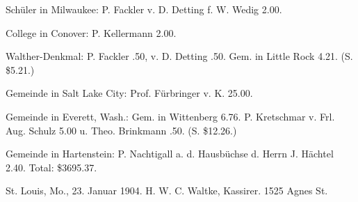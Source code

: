Schüler in Milwaukee: P. Fackler v. D. Detting f. W. Wedig 2.00.

College in Conover: P. Kellermann 2.00.

Walther-Denkmal: P. Fackler .50, v. D. Detting .50. Gem. in Little Rock 4.21. (S. \$5.21.)

Gemeinde in Salt Lake City: Prof. Fürbringer v. K. 25.00.

Gemeinde in Everett, Wash.: Gem. in Wittenberg 6.76. P. Kretschmar v. Frl. Aug. Schulz 5.00 u. Theo. Brinkmann .50. (S. \$12.26.)

Gemeinde in Hartenstein: P. Nachtigall a. d. Hausbüchse d. Herrn J. Hächtel 2.40. Total: \$3695.37.

St. Louis, Mo., 23. Januar 1904. H. W. C. Waltke, Kassirer. 1525 Agnes St.

